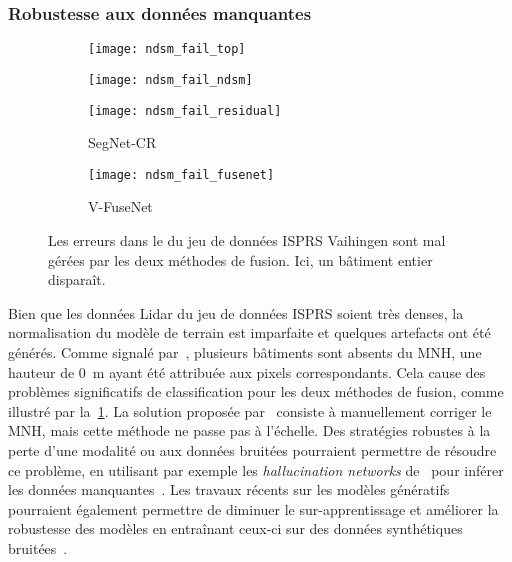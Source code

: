 \subsubsection{Robustesse aux données manquantes}

\begin{figure}[h]
	\captionsetup[subfigure]{singlelinecheck=off,justification=centering}
    \captionsetup[subfigure]{labelformat=empty}
    \begin{subfigure}{0.24\textwidth}
    	\texttt{[image: ndsm\_fail\_top]}
        \caption{}
    \end{subfigure}
    \begin{subfigure}{0.24\textwidth}
    	\texttt{[image: ndsm\_fail\_ndsm]}
        \caption{}
    \end{subfigure}
    \begin{subfigure}{0.24\textwidth}
    	\texttt{[image: ndsm\_fail\_residual]}
        \caption{SegNet-CR}
    \end{subfigure}
    \begin{subfigure}{0.24\textwidth}
    	\texttt{[image: ndsm\_fail\_fusenet]}
        \caption{V-FuseNet}
    \end{subfigure}
	\caption{Les erreurs dans le  du jeu de données \gls{ISPRS} Vaihingen sont mal gérées par les deux méthodes de fusion. Ici, un bâtiment entier disparaît.}
    \label{fig:ndsm_fail}
\end{figure}

Bien que les données \gls{Lidar} du jeu de données \gls{ISPRS} soient très denses, la normalisation du modèle de terrain est imparfaite et quelques artefacts ont été générés. Comme signalé par~\citet{marmanis_classification_2017}, plusieurs bâtiments sont absents du \gls{MNH}, une hauteur de \SI{0}{\meter} ayant été attribuée aux pixels correspondants. Cela cause des problèmes significatifs de classification pour les deux méthodes de fusion, comme illustré par la~\cref{fig:ndsm_fail}. La solution proposée par~\cite{marmanis_classification_2017} consiste à manuellement corriger le \gls{MNH}, mais cette méthode ne passe pas à l'échelle. Des stratégies robustes à la perte d'une modalité ou aux données bruitées pourraient permettre de résoudre ce problème, en utilisant par exemple les \emph{hallucination networks} de~\citet{hoffman_learning_2016} pour inférer les données manquantes~\cite{kampffmeyer_semantic_2016}. Les travaux récents sur les modèles génératifs pourraient également permettre de diminuer le sur-apprentissage et améliorer la robustesse des modèles en entraînant ceux-ci sur des données synthétiques bruitées~\cite{xie_adversarial_2017}.

